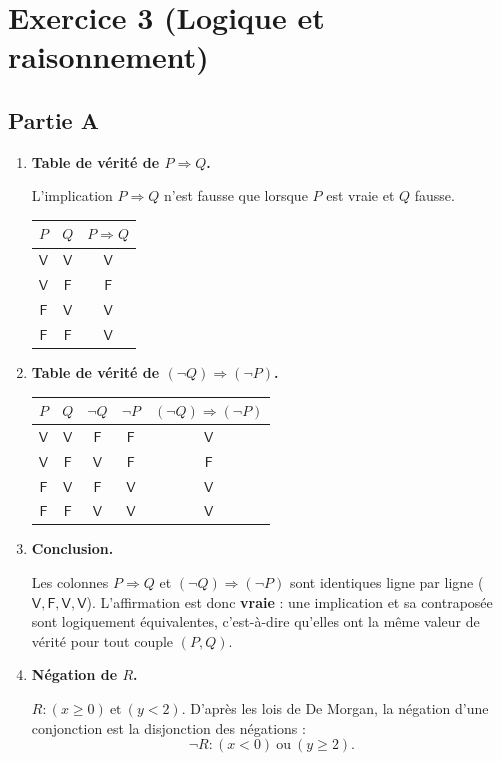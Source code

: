 \documentclass[11pt,a4paper]{article}
\newcommand{\exo}[1]{\section*{#1}}
\newcommand{\V}{\mathsf{V}}
\newcommand{\F}{\mathsf{F}}
\begin{document}
\newpage
\exo{Exercice 3 (Logique et raisonnement)}

\subsection*{Partie A}

\begin{enumerate}

\item \textbf{Table de vérité de $P\Rightarrow Q$.}

L'implication $P\Rightarrow Q$ n'est fausse que lorsque $P$ est vraie et $Q$ fausse.
\begin{center}
\begin{tabular}{|c|c|c|}
\hline
$P$ & $Q$ & $P\Rightarrow Q$ \\ \hline
$\V$ & $\V$ & $\V$ \\ \hline
$\V$ & $\F$ & $\F$ \\ \hline
$\F$ & $\V$ & $\V$ \\ \hline
$\F$ & $\F$ & $\V$ \\ \hline
\end{tabular}
\end{center}

\item \textbf{Table de vérité de $(\neg Q)\Rightarrow(\neg P)$.}

\begin{center}
\begin{tabular}{|c|c|c|c|c|}
\hline
$P$ & $Q$ & $\neg Q$ & $\neg P$ & $(\neg Q)\Rightarrow(\neg P)$ \\ \hline
$\V$ & $\V$ & $\F$ & $\F$ & $\V$ \\ \hline
$\V$ & $\F$ & $\V$ & $\F$ & $\F$ \\ \hline
$\F$ & $\V$ & $\F$ & $\V$ & $\V$ \\ \hline
$\F$ & $\F$ & $\V$ & $\V$ & $\V$ \\ \hline
\end{tabular}
\end{center}

\item \textbf{Conclusion.}

Les colonnes $P\Rightarrow Q$ et $(\neg Q)\Rightarrow(\neg P)$ sont identiques ligne par ligne
($\V,\F,\V,\V$). L'affirmation est donc \textbf{vraie} : une implication et sa contraposée sont
logiquement équivalentes, c'est-à-dire qu'elles ont la même valeur de vérité pour tout couple $(P,Q)$.

\item \textbf{Négation de $R$.}

$R : (x\geqslant0)\ \text{et}\ (y<2)$. D'après les lois de De Morgan, la négation d'une conjonction
est la disjonction des négations :
\[
\neg R : (x<0)\ \text{ou}\ (y\geqslant 2).
\]
\end{enumerate}
\end{document}
